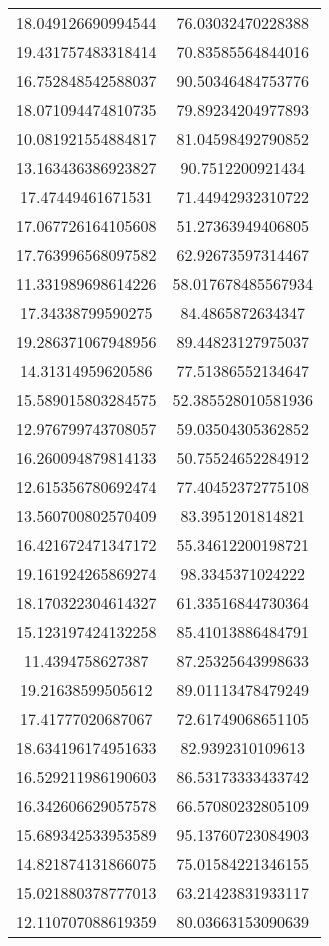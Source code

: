 \begin{table}
\begin{tabular}{cc}
18.049126690994544 & 76.03032470228388 \\
19.431757483318414 & 70.83585564844016 \\
16.752848542588037 & 90.50346484753776 \\
18.071094474810735 & 79.89234204977893 \\
10.081921554884817 & 81.04598492790852 \\
13.163436386923827 & 90.7512200921434 \\
17.47449461671531 & 71.44942932310722 \\
17.067726164105608 & 51.27363949406805 \\
17.763996568097582 & 62.92673597314467 \\
11.331989698614226 & 58.017678485567934 \\
17.34338799590275 & 84.4865872634347 \\
19.286371067948956 & 89.44823127975037 \\
14.31314959620586 & 77.51386552134647 \\
15.589015803284575 & 52.385528010581936 \\
12.976799743708057 & 59.03504305362852 \\
16.260094879814133 & 50.75524652284912 \\
12.615356780692474 & 77.40452372775108 \\
13.560700802570409 & 83.3951201814821 \\
16.421672471347172 & 55.34612200198721 \\
19.161924265869274 & 98.3345371024222 \\
18.170322304614327 & 61.33516844730364 \\
15.123197424132258 & 85.41013886484791 \\
11.4394758627387 & 87.25325643998633 \\
19.21638599505612 & 89.01113478479249 \\
17.41777020687067 & 72.61749068651105 \\
18.634196174951633 & 82.9392310109613 \\
16.529211986190603 & 86.53173333433742 \\
16.342606629057578 & 66.57080232805109 \\
15.689342533953589 & 95.13760723084903 \\
14.821874131866075 & 75.01584221346155 \\
15.021880378777013 & 63.21423831933117 \\
12.110707088619359 & 80.03663153090639 \\

\end{tabular}
\end{table}
